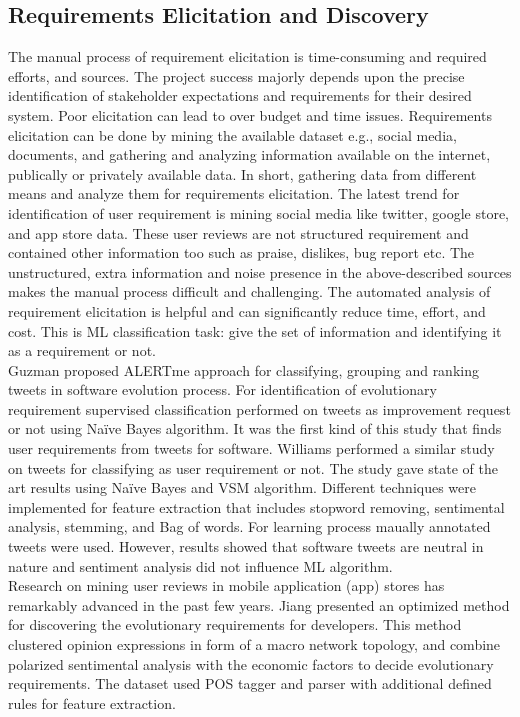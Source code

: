 
\subsection{Requirements Elicitation and Discovery}

The manual process of requirement elicitation is time-consuming and required
efforts, and sources. The project success majorly depends upon the precise
identification of stakeholder expectations and requirements for their desired
system. Poor elicitation can lead to over budget and time issues. Requirements
elicitation can be done by mining the available dataset e.g., social media,
documents, and gathering and analyzing information available on the internet,
publically or privately available data. In short, gathering data from different
means and analyze them for requirements elicitation.  The latest trend for
identification of user requirement is mining social media like twitter, google
store, and app store data. These user reviews are not structured requirement and
contained other information too such as praise, dislikes, bug report etc.  The
unstructured, extra information and noise presence in the above-described
sources makes the manual process difficult and challenging. The automated
analysis of requirement elicitation is helpful and can significantly reduce
time, effort, and cost. This is ML classification task: give the set of
information and identifying it as a requirement or not.
\\

	Guzman \etal \cite{Guzman:2017} proposed ALERTme approach for classifying,
grouping and ranking tweets in software evolution process. For identification of
evolutionary requirement supervised classification performed on tweets as
improvement request or not using Naïve Bayes algorithm. It was the first kind of
this study that finds user requirements from tweets for software. Williams \etal
 \cite{Williams:2017} performed a similar study on
tweets for classifying as user requirement or not. The study gave state of the
art results using Naïve Bayes and VSM algorithm. Different
techniques were implemented for feature extraction that includes stopword removing, sentimental
analysis, stemming, and Bag of words.
For learning process maually annotated tweets were used. However, results showed
that software tweets are neutral in nature and sentiment analysis did not
influence ML algorithm.\\

	Research on mining user reviews in mobile application (app) stores has
remarkably advanced in the past few years. Jiang \etal \cite{Jiang:2014}
presented an optimized method for discovering the evolutionary requirements for
developers. This method clustered opinion expressions in form of a macro network
topology, and combine polarized sentimental analysis with the economic factors
to decide evolutionary requirements. The dataset used POS tagger and parser with
additional defined rules for feature extraction.\\

